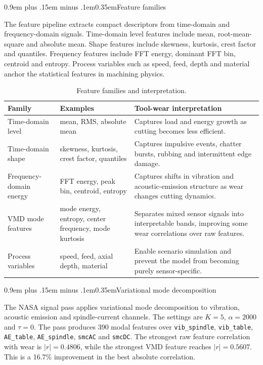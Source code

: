 \documentclass[10pt]{article}
\makeatletter
\newcommand{\code}[1]{\texttt{#1}}
\renewcommand\subsection{\@startsection{subsection}{2}{0pt}%
  {0.9em plus .15em minus .1em}{0.35em}{\normalfont\small\bfseries}}
\makeatother
\begin{document}
\subsection{Feature families}

The feature pipeline extracts compact descriptors from time-domain and frequency-domain signals. Time-domain level features include mean, root-mean-square and absolute mean. Shape features include skewness, kurtosis, crest factor and quantiles. Frequency features include FFT energy, dominant FFT bin, centroid and entropy. Process variables such as speed, feed, depth and material anchor the statistical features in machining physics.

\begin{table}[!t]
  \centering
  \caption{Feature families and interpretation.}
  \label{tab:feature-families}
  \footnotesize
  \begin{tabularx}{\textwidth}{p{2.7cm}p{4.2cm}Y}
    \toprule
    Family & Examples & Tool-wear interpretation \\
    \midrule
    Time-domain level & mean, RMS, absolute mean & Captures load and energy growth as cutting becomes less efficient. \\
    Time-domain shape & skewness, kurtosis, crest factor, quantiles & Captures impulsive events, chatter bursts, rubbing and intermittent edge damage. \\
    Frequency-domain energy & FFT energy, peak bin, centroid, entropy & Captures shifts in vibration and acoustic-emission structure as wear changes cutting dynamics. \\
    VMD mode features & mode energy, entropy, center frequency, mode kurtosis & Separates mixed sensor signals into interpretable bands, improving some wear correlations over raw features. \\
    Process variables & speed, feed, axial depth, material & Enable scenario simulation and prevent the model from becoming purely sensor-specific. \\
    \bottomrule
  \end{tabularx}
\end{table}

\subsection{Variational mode decomposition}

The NASA signal pass applies variational mode decomposition to vibration, acoustic emission and spindle-current channels. The settings are \(K=5\), \(\alpha=2000\) and \(\tau=0\). The pass produces 390 modal features over \code{vib\_spindle}, \code{vib\_table}, \code{AE\_table}, \code{AE\_spindle}, \code{smcAC} and \code{smcDC}. The strongest raw feature correlation with wear is \(|r|=0.4806\), while the strongest VMD feature reaches \(|r|=0.5607\). This is a 16.7\% improvement in the best absolute correlation.
\end{document}
